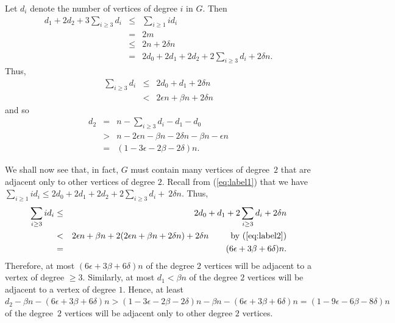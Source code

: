 \documentclass{article}
\newtheorem{Proof of Theorem}{Proof of Theorem}
\begin{document}
Let $d_{i}$ denote the number of vertices of degree $i$ in $G$.
Then 
\begin{eqnarray}
d_{1} + 2d_{2} + 3 \sum_{i \geq 3}d_{i} 
& \leq & \sum_{i \geq 1}id_{i} \nonumber \\
& = & 2m \nonumber \\
& \leq & 2n +2\delta n \nonumber \\
& = & 2d_{0} + 2d_{1} + 2d_{2} + 2 \sum_{i \geq 3}d_{i} + 2\delta n. \label{eq:label1}
\end{eqnarray}
Thus, 
\begin{eqnarray}
\sum_{i \geq 3}d_{i} 
& \leq & 2d_{0} + d_{1} + 2\delta n \nonumber \\
& < & 2 \epsilon n + \beta n + 2\delta n \label{eq:label2}
\end{eqnarray}
and so
\begin{eqnarray*}
d_{2} 
& = & n - \sum_{i \geq 3}d_{i} - d_{1} - d_{0} \\
& > & n - 2 \epsilon n - \beta n - 2 \delta n - \beta n - \epsilon n \\
& = & \left( 1-3\epsilon - 2\beta -2\delta \right)n. 
\end{eqnarray*}

We shall now see that, in fact,
$G$ must contain many vertices of degree~$2$ that are adjacent only to other vertices of degree $2$. 
Recall from (\ref{eq:label1}) that we have
$\sum_{i \geq 1}id_{i} \leq 2d_{0} + 2d_{1} + 2d_{2} + 2 \sum_{i \geq 3}d_{i} +~2\delta n$.
Thus, 
\begin{eqnarray*}
\sum_{i \geq 3}id_{i} 
& \leq & 2d_{0} + d_{1} + 2\sum_{i \geq 3}d_{i} + 2\delta n \\
& < & 2 \epsilon n + \beta n + 2(2 \epsilon n + \beta n + 2\delta n) + 2 \delta n \phantom{www}
\textrm{ by (\ref{eq:label2})} \\
& = & (6 \epsilon + 3 \beta + 6 \delta)n.
\end{eqnarray*}
Therefore, at most $(6 \epsilon + 3 \beta + 6 \delta)n$ of the degree $2$ vertices 
will be adjacent to a vertex of degree $\geq 3$.
Similarly, at most $d_{1} < \beta n$ of the degree $2$ vertices will be adjacent to a vertex of degree $1$.
Hence, at least 
$d_{2} - \beta n - (6 \epsilon +3 \beta + 6 \delta)n
> (1- 3 \epsilon - 2 \beta - 2 \delta)n - \beta n - (6 \epsilon + 3 \beta + 6 \delta)n
= (1-9 \epsilon - 6 \beta - 8\delta)n$
of the degree~$2$ vertices will be adjacent only to other degree $2$ vertices. 
\end{document}
